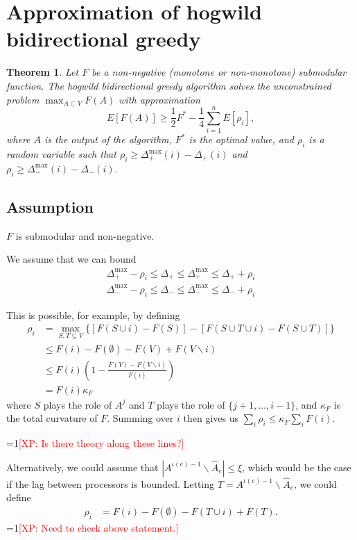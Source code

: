 \documentclass{article} %
\newtheorem{thm}{Theorem}[section]
\newcommand{\Comments}{1}
\newcommand{\note}[2]{\ifnum\Comments=1\textcolor{#1}{#2}\fi}
\newcommand{\xinghao}[1]{\note{red}{[XP: #1]}}
\begin{document}
\section{Approximation of hogwild bidirectional greedy}
\begin{thm}\label{thm:randomapprox} Let $F$ be a non-negative (monotone or non-monotone) submodular function.
The hogwild bidirectional greedy algorithm solves the unconstrained problem $\max_{A\subset V} F(A)$ with approximation
\[
E[F(A)] \geq \frac{1}{2}F^* - \frac{1}{4}\sum_{i=1}^n E[\rho_i],
\]
where $A$ is the output of the algorithm, $F^*$ is the optimal value, and $\rho_i$ is a random variable such that $\rho_i \geq \Delta_+^{\max}(i) - \Delta_+(i)$ and $\rho_i \geq \Delta_-^{\max}(i) - \Delta_-(i)$.
\end{thm}

\subsection{Assumption}
$F$ is submodular and non-negative.

We assume that we can bound
\begin{align*}
\Delta_+^{\max} - \rho_i \leq \Delta_+ \leq \Delta_+^{\max} \leq \Delta_+ + \rho_i\\
\Delta_-^{\max} - \rho_i \leq \Delta_- \leq \Delta_-^{\max} \leq \Delta_- + \rho_i
\end{align*}

This is possible, for example, by defining
\begin{align*}
\rho_i
&= \max_{S,T\subseteq V} \{[F(S\cup i) - F(S)] - [F(S \cup T \cup i) - F(S \cup T)]\}\\
&\leq F(i) - F(\emptyset) - F(V) + F(V\backslash i)\\
&\leq F(i)\left(1 - \frac{F(V) - F(V\backslash i)}{F(i)}\right)\\
&= F(i)\kappa_F
\end{align*}
where $S$ plays the role of $A^j$ and $T$ plays the role of $\{j+1,\dots, i-1\}$, and $\kappa_F$ is the total curvature of $F$.
Summing over $i$ then gives us $\sum_i \rho_i \leq \kappa_F\sum_i F(i)$.


\xinghao{Is there theory along these lines?}

Alternatively, we could assume that $|A^{\iota(e)-1} \backslash \hat{A}_e| \leq \xi$, which would be the case if the lag between processors is bounded.
Letting $T = A^{\iota(e)-1} \backslash \hat{A}_e$, we could define
\begin{align*}
\rho_i
&= F(i) - F(\emptyset) - F(T \cup i) + F(T).
\end{align*}
\xinghao{Need to check above statement.}
\end{document}
